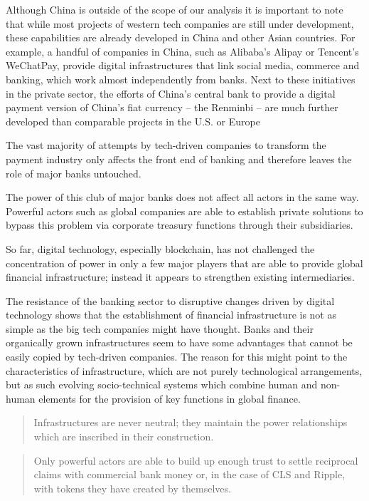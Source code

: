 \documentclass[
]{book}
\begin{document}
Although China is outside of the scope of our analysis it is important to note that while most projects of western tech companies are still under development, these capabilities are already developed in China and other Asian countries. For example, a handful of companies in China, such as Alibaba's Alipay or Tencent's WeChatPay, provide digital infrastructures that link social media, commerce and banking, which work almost independently from banks. Next to these initiatives in the private sector, the efforts of China's central bank to provide a digital payment version of China's fiat currency -- the Renminbi -- are much further developed than comparable projects in the U.S. or Europe

The vast majority of attempts by tech-driven companies to transform the payment industry only affects the front end of banking and therefore leaves the role of major banks untouched.

The power of this club of major banks does not affect all actors in the same way. Powerful actors such as global companies are able to establish private solutions to bypass this problem via corporate treasury functions through their subsidiaries.

So far, digital technology, especially blockchain, has not challenged the concentration of power in only a few major players that are able to provide global financial infrastructure; instead it appears to strengthen existing intermediaries.

The resistance of the banking sector to disruptive changes driven by digital technology shows that the establishment of financial infrastructure is not as simple as the big tech companies might have thought. Banks and their organically grown infrastructures seem to have some advantages that cannot be easily copied by tech-driven companies. The reason for this might point to the characteristics of infrastructure, which are not purely technological arrangements, but as such evolving socio-technical systems which combine human and non-human elements for the provision of key functions in global finance.

\begin{quote}
Infrastructures are never neutral; they maintain the power relationships which are inscribed in their construction.
\end{quote}

\begin{quote}
Only powerful actors are able to build up enough trust to settle reciprocal claims with commercial bank money or, in the case of CLS and Ripple, with tokens they have created by themselves.
\end{quote}
\end{document}
